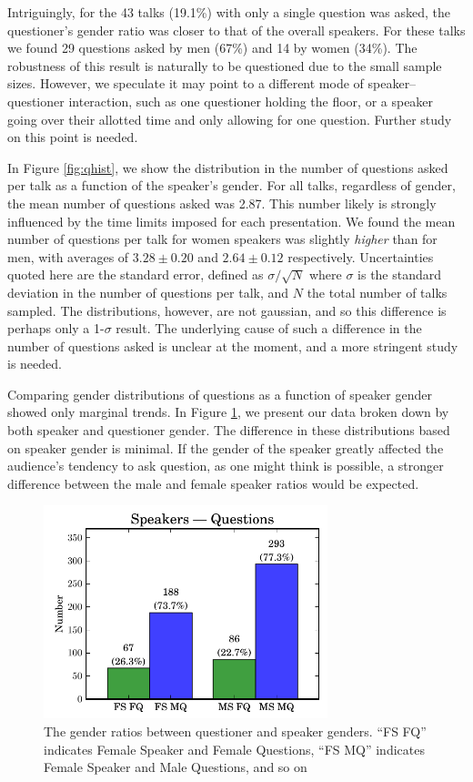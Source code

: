 \documentclass[iop]{emulateapj}
\begin{document}
Intriguingly, for the 43 talks (19.1\%) with only a single question was asked, the questioner's gender ratio was closer to that of the overall speakers. For these talks we found 29 questions asked by men (67\%) and 14 by women (34\%). The robustness of this result is naturally to be questioned due to the small sample sizes. However, we speculate it may point to a different mode of speaker--questioner interaction, such as one questioner holding the floor, or a speaker going over their allotted time and only allowing for one question. Further study on this point is needed.



In Figure \ref{fig:qhist}, we show the distribution in the number of questions asked per talk as a function of the speaker's gender. For all talks, regardless of gender, the mean number of questions asked was 2.87. This number likely is strongly influenced by the time limits imposed for each presentation. We found the mean number of questions per talk for women speakers was slightly {\it higher} than for men, with averages of $3.28 \pm 0.20$ and $2.64\pm0.12$ respectively. Uncertainties quoted here are the standard error, defined as $\sigma/\sqrt{N}$ where $\sigma$ is the standard deviation in the number of questions per talk, and $N$ the total number of talks sampled. The distributions, however, are not gaussian, and so this difference is perhaps only a 1-$\sigma$ result. The underlying cause of such a difference in the number of questions asked is unclear at the moment, and a more stringent study is needed.


Comparing gender distributions of questions as a function of speaker gender showed only marginal trends. In Figure \ref{fig:sq}, we present our data broken down by both speaker and questioner gender. The difference in these distributions based on speaker gender is minimal.  If the gender of the speaker greatly affected the audience's tendency to ask question, as one might think is possible, a stronger difference between the male and female speaker ratios would be expected. 



\begin{figure}[!th]
\centering
\includegraphics[width=3.25in]{speakers_questions}
\caption{The gender ratios between questioner and speaker genders. ``FS FQ'' indicates Female Speaker and Female Questions, ``FS MQ'' indicates Female Speaker and Male Questions, and so on}
\label{fig:sq}
\end{figure}
\end{document}
